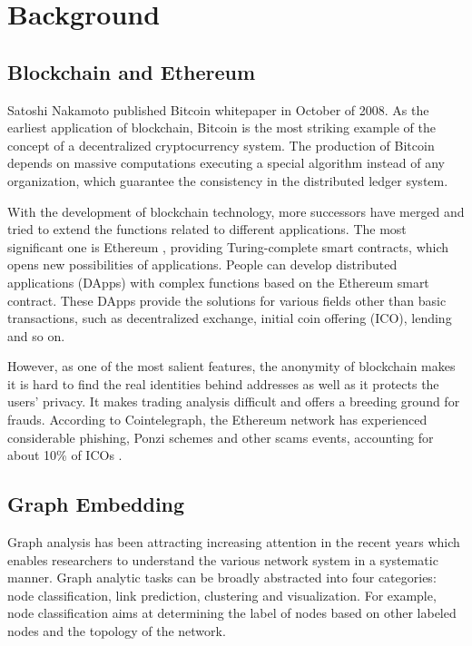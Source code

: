 
\section{Background}
\subsection{Blockchain and Ethereum}
Satoshi Nakamoto published Bitcoin whitepaper \cite{Nakamoto2008} in October of 2008. As the earliest application of blockchain, Bitcoin is the most striking example of the concept of a decentralized cryptocurrency system. The production of Bitcoin depends on massive computations executing a special algorithm instead of any organization, which guarantee the consistency in the distributed ledger system.

With the development of blockchain technology, more successors have merged and tried to extend the functions related to different applications. The most significant one is Ethereum \cite{buterin2013ethereum}, providing Turing-complete smart contracts, which opens new possibilities of applications. People can develop distributed applications (DApps) with complex functions based on the Ethereum smart contract. These DApps provide the solutions for various fields other than basic transactions, such as decentralized exchange, initial coin offering (ICO), lending and so on.

However, as one of the most salient features, the anonymity of blockchain makes it is hard to find the real identities behind addresses as well as it protects the users' privacy. It makes trading analysis difficult and offers a breeding ground for frauds. According to Cointelegraph, the Ethereum network has experienced considerable phishing, Ponzi schemes and other scams events, accounting for about 10\% of ICOs \cite{cerchiello2018icos}.
\subsection{Graph Embedding}
Graph analysis has been attracting increasing attention in the recent years which enables researchers to understand the various network system in a systematic manner. Graph analytic tasks can be broadly abstracted into four categories: node classification\cite{bhagat2011node}, link prediction\cite{liben2007link}, clustering\cite{ding2001min} and visualization\cite{maaten2008visualizing}. For example, node classification aims at determining the label of nodes based on other labeled nodes and the topology of the network.

